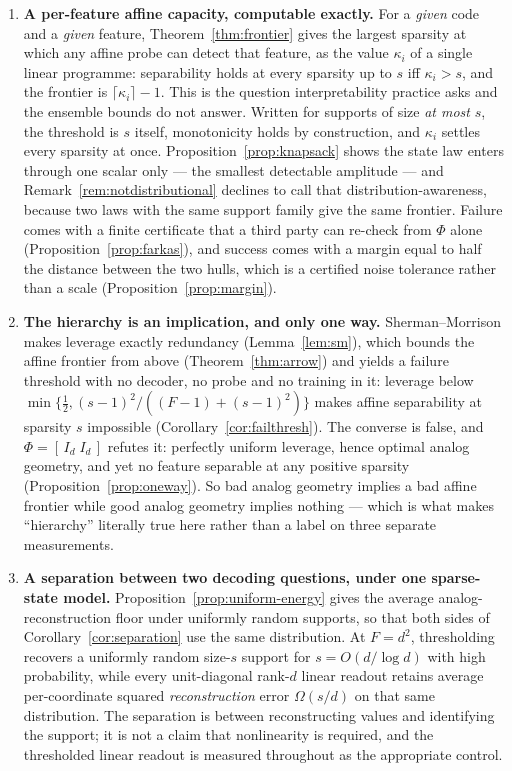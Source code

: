 \documentclass[preprint,12pt]{elsarticle}
\theoremstyle{definition}
\begin{document}
\begin{enumerate}[leftmargin=*]
\item \textbf{A per-feature affine capacity, computable exactly.} For a \emph{given} code and a
\emph{given} feature, Theorem~\ref{thm:frontier} gives the largest sparsity at which any affine
probe can detect that feature, as the value $\kappa_i$ of a single linear programme:
separability holds at every sparsity up to $s$ iff $\kappa_i>s$, and the frontier is
$\lceil\kappa_i\rceil-1$. This is the question interpretability practice asks and the ensemble
bounds do not answer. Written for supports of size \emph{at most} $s$, the threshold is $s$
itself, monotonicity holds by construction, and $\kappa_i$ settles every sparsity at once.
Proposition~\ref{prop:knapsack} shows the state law enters through one scalar only --- the
smallest detectable amplitude --- and Remark~\ref{rem:notdistributional} declines to call that
distribution-awareness, because two laws with the same support family give the same frontier.
Failure comes with a finite certificate that a third party can re-check from $\Phi$ alone
(Proposition~\ref{prop:farkas}), and success comes with a margin equal to half the distance
between the two hulls, which is a certified noise tolerance rather than a scale
(Proposition~\ref{prop:margin}).

\item \textbf{The hierarchy is an implication, and only one way.} Sherman--Morrison makes leverage
exactly redundancy (Lemma~\ref{lem:sm}), which bounds the affine frontier from above
(Theorem~\ref{thm:arrow}) and yields a failure threshold with no decoder, no probe and no
training in it: leverage below $\min\{\tfrac12,(s-1)^2/((F-1)+(s-1)^2)\}$ makes affine separability
at sparsity $s$ impossible (Corollary~\ref{cor:failthresh}). The converse is false, and
$\Phi=[\,I_d\;I_d\,]$ refutes it: perfectly uniform leverage, hence optimal analog geometry, and yet
no feature separable at any positive sparsity (Proposition~\ref{prop:oneway}). So bad analog geometry implies a bad
affine frontier while good analog geometry implies nothing --- which is what makes ``hierarchy''
literally true here rather than a label on three separate measurements.

\item \textbf{A separation between two decoding questions, under one sparse-state model.}
Proposition~\ref{prop:uniform-energy} gives the average analog-reconstruction floor under
uniformly random supports, so that both sides of Corollary~\ref{cor:separation} use the same
distribution. At $F=d^2$, thresholding recovers a uniformly random size-$s$ support for
$s=O(d/\log d)$ with high probability, while every unit-diagonal rank-$d$ linear readout
retains average per-coordinate squared \emph{reconstruction} error $\Omega(s/d)$ on that same
distribution. The separation is between reconstructing values and identifying the support; it
is not a claim that nonlinearity is required, and the thresholded linear readout is measured
throughout as the appropriate control.


\end{enumerate}
\end{document}
